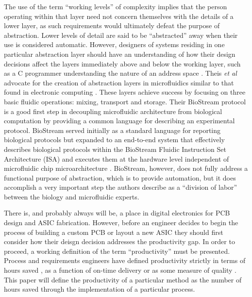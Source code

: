 The use of the term ``working levels'' of complexity implies that the person operating within that layer need not concern themselves with the details of a lower layer, as such requirements would ultimately defeat the purpose of abstraction. Lower levels of detail are said to be ``abstracted'' away when their use is considered automatic. However, designers of systems residing in one particular abstraction layer should have an understanding of how their design decisions affect the layers immediately above and below the working layer, such as a C programmer understanding the nature of an address space \cite{Harris+Harris}. Theis \emph{et al} advocate for the creation of abstraction layers in microfluidics similar to that found in electronic computing \cite{thies2008}. These layers achieve success by focusing on three basic fluidic operations: mixing, transport and storage. Their BioStream protocol is a good first step in decoupling microfluidic architecture from biological computation by providing a common language for describing an experimental protocol. BioStream served initially as a standard language for reporting biological protocols but expanded to an end-to-end system that effectively describes biological protocols within the BioStream Fluidic Instruction Set Architecture (ISA) and executes them at the hardware level independent of microfluidic chip microarchitecture \cite{thies2008}. BioStream, however, does not fully address a functional purpose of abstraction, which is to provide automation, but it does accomplish a very important step the authors describe as a ``division of labor'' between the biology and microfluidic experts. 

There is, and probably always will be, a place in digital electronics for PCB design and ASIC fabrication. However, before an engineer decides to begin the process of building a custom PCB or layout a new ASIC they should first consider how their deisgn decision addresses the productivity gap. In order to proceed, a working definition of the term ``productivity'' must be presented. Process and requirements engineers \cite{Review_ProcessEngr} have defined productivity strictly in terms of hours saved \cite{CostBenefit_hours}, as a function of on-time delivery \cite{OnTimeDelivery} or as some measure of quality \cite{Quality}. This paper will define the productivity of a particular method as the number of hours saved through the implementation of a particular process.

